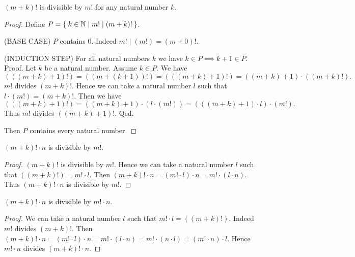 \documentclass[../../arithmetic.tex]{subfiles}
\begin{document}
  \begin{forthel}
    \begin{proposition}\label{Arithmetic_03_06_805525}
      $(m + k)!$ is divisible by $m!$ for any natural number $k$.
    \end{proposition}
    \begin{proof}
      Define $P = \Set{k \in \mathbb{N} | m! \mid (m + k)!}$.

      (BASE CASE) $P$ contains $0$.
      Indeed $m! \mid (m!) = (m + 0)!$.

      (INDUCTION STEP) For all natural numbers $k$ we have $k \in P \implies k + 1 \in P$. \\
      Proof.
        Let $k$ be a natural number.
        Assume $k \in P$.
        We have
        \[  (((m + k) + 1)!)
            = ((m + (k + 1))!)
            = (((m + k) + 1)!)
            = ((m + k) + 1) \cdot ((m + k)!). \]
        $m!$ divides $(m + k)!$.
        Hence we can take a natural number $l$ such that $l \cdot (m!) = (m + k)!$.
        Then we have
        \[  (((m + k) + 1)!)
            = ((m + k) + 1) \cdot (l \cdot (m!))
            = (((m + k) + 1) \cdot l) \cdot (m!). \]
        Thus $m!$ divides $((m + k) + 1)!$.
      Qed.

      Then $P$ contains every natural number.
    \end{proof}

    \begin{corollary}\label{Arithmetic_03_06_797409}
      $(m + k)! \cdot n$ is divisible by $m!$.
    \end{corollary}
    \begin{proof}
      $(m + k)!$ is divisible by $m!$.
      Hence we can take a natural number $l$ such that $((m + k)!) = m! \cdot l$.
      Then $(m + k)! \cdot n = (m! \cdot l) \cdot n = m! \cdot (l \cdot n)$.
      Thus $(m + k)! \cdot n$ is divisible by $m!$.
    \end{proof}

    \begin{corollary}\label{Arithmetic_03_06_319523}
      $(m + k)! \cdot n$ is divisible by $m! \cdot n$.
    \end{corollary}
    \begin{proof}
      We can take a natural number $l$ such that $m! \cdot l = ((m + k)!)$.
      Indeed $m!$ divides $(m + k)!$.
      Then $(m + k)! \cdot n = (m! \cdot l) \cdot n = m! \cdot (l \cdot n) = m! \cdot (n \cdot l) = (m! \cdot n) \cdot l$.
      Hence $m! \cdot n$ divides $(m + k)! \cdot n$.
    \end{proof}


\end{forthel}
\end{document}
